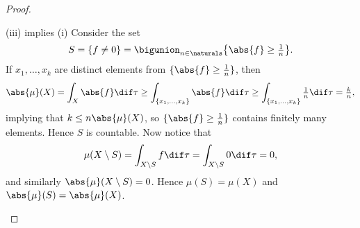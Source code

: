 \documentclass[article, a4paper, 11pt, oneside]{memoir}
\numberwithin{equation}{chapter}
\begin{document}
\begin{proof}
\begin{proofsec}
    \item[(iii) implies (i)]
    Consider the set
    \begin{equation*}
        S
            = \{ f \neq 0 \}
            = \bigunion_{n \in \naturals} \bigl\{ \abs{f} \geq \tfrac{1}{n} \bigr\}.
    \end{equation*}
    If $x_1, \ldots, x_k$ are distinct elements from $\{ \abs{f} \geq \tfrac{1}{n} \}$, then
    \begin{equation*}
        \abs{\mu}(X)
            = \int_X \abs{f} \dif\tau
            \geq \int_{\{x_1, \ldots, x_k\}} \abs{f} \dif\tau
            \geq \int_{\{x_1, \ldots, x_k\}} \tfrac{1}{n} \dif\tau
            = \tfrac{k}{n},
    \end{equation*}
    implying that $k \leq n \abs{\mu}(X)$, so $\{ \abs{f} \geq \tfrac{1}{n} \}$ contains finitely many elements. Hence $S$ is countable. Now notice that
    \begin{equation*}
        \mu(X \setminus S)
            = \int_{X \setminus S} f \dif\tau
            = \int_{X \setminus S} 0 \dif\tau
            = 0,
    \end{equation*}
    and similarly $\abs{\mu}(X \setminus S) = 0$. Hence $\mu(S) = \mu(X)$ and $\abs{\mu}(S) = \abs{\mu}(X)$.
\end{proofsec}
\end{proof}



\nocite{*}

\printbibliography
\end{document}
